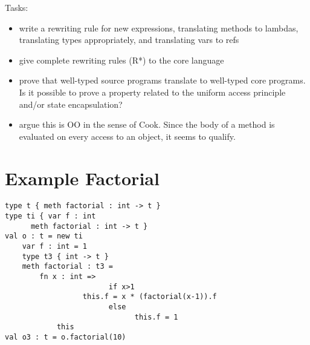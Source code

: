 Tasks:

\begin{itemize}

 \item write a rewriting rule for new expressions, translating methods to lambdas, translating types appropriately, and translating vars to refs
 \item give complete rewriting rules (R*) to the core language
 \item prove that well-typed source programs translate to well-typed core programs.  Is it possible to prove a property related to the uniform access principle and/or state encapsulation?
 \item argue this is OO in the sense of Cook.  Since the body of a method is evaluated on every access to an object, it seems to qualify.
\end{itemize}

\section{Example Factorial}
\begin{lstlisting}
type t { meth factorial : int -> t }
type ti { var f : int
	  meth factorial : int -> t }
val o : t = new ti
	var f : int = 1
	type t3 { int -> t }  
	meth factorial : t3 =
		fn x : int =>
                        if x>1 
			      this.f = x * (factorial(x-1)).f
                        else
                              this.f = 1
			this
val o3 : t = o.factorial(10)
\end{lstlisting}


